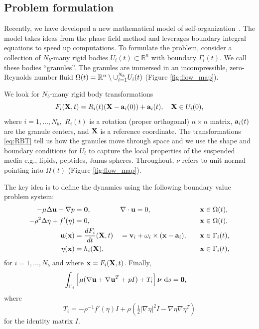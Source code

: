 \subsection{Problem formulation}
Recently, we have developed a new mathematical model of
self-organization~\cite{FuQuRyYo22,fu-ryh-qua-you2022,Fu2018_SIAM}. The
model takes ideas from the phase field method and leverages boundary
integral equations to speed up computations. To formulate the problem,
consider a collection of $N_b$-many rigid bodies $U_i(t) \subset \mathbb{R}^n$
with boundary $\Gamma_i(t)$.
We call these bodies ``granules''.
The granules are immersed 
in an incompressible, zero-Reynolds number fluid
$\Omega(t) = \RR^n \setminus \cup_{i=1}^{N_b} U_i(t)$
(Figure \ref{fig:flow_map}).

We look for $N_b$-many rigid body transformations
\begin{equation}
\label{eq:RBT}
F_i(\XX,t) = R_i(t)(\XX - \aa_i(0)) + \aa_i(t),\quad \XX \in U_i(0),
\end{equation}
where $i = 1,\ldots,N_b,$
$R_i(t)$ is a rotation (proper orthogonal) $n \times n$ matrix,
$\aa_i(t)$ are the granule centers, and $\XX$ is a reference coordinate.
The transformations \eqref{eq:RBT} tell us how the granules move through space
and we use the shape and
boundary conditions for $U_i$ to capture the local
properties of the suspended media e.g., lipids, peptides, Janus spheres.
Throughout, $\nu$ refers to unit normal pointing into $\Omega(t)$ (Figure \ref{fig:flow_map}).

The key idea is to define the dynamics using the following
boundary value problem system:
\begin{alignat}{4}
  -\mu\Delta \uu + \nabla p &= \mathbf{0}, 
  && \nabla \cdot \uu = 0, && \quad \xx \in \Omega(t), \label {eqn:stokes} \\
  \label{eqn:phase}
  -\rho^2 \Delta \eta + f'(\eta) &= 0, && &&\quad \xx \in \Omega(t),\\
\label{eqn:noslip}        
\uu(\xx) &= \frac{dF_i}{dt}(\XX,t)
&&=\vv_i + \omega_i \times (\xx - \aa_i), 
&&\quad \xx \in \Gamma_i(t),\\
\label{eqn:material}
\eta(\xx) &= h_i(\XX), &&  &&\quad \xx \in \Gamma_i(t),
\end{alignat}
for $i=1,\ldots,N_b$
and where $\xx = F_i(\XX,t)$.
Finally,
\begin{equation}
\label{eqn:stressbalance}
\int_{\Gamma_i} \left[\mu(\nabla \uu + \nabla \uu^T + pI) + T_i\right]\nnu \,\dif s = \mathbf{0},\quad
\end{equation}
where
\begin{equation}
\label{eqn:hydro_stress}
T_i = -\rho^{-1} f'(\eta)I
  + \rho\left(\tfrac{1}{2}|\nabla \eta|^2I - \nabla \eta \nabla
  \eta^T\right)
\end{equation}
for the identity matrix $I$.

